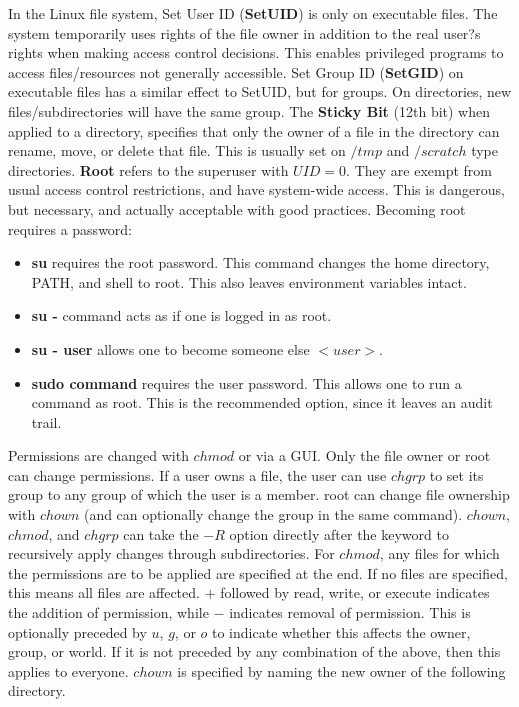 \documentclass[11pt]{article}
\theoremstyle{plain} %
\theoremstyle{definition}
\theoremstyle{example}
\theoremstyle{remark}
\begin{document}
In the Linux file system, Set User ID (\textbf{SetUID}) is only on executable files. The system temporarily uses rights of the file owner in addition to the real user?s rights when making access control decisions. This enables privileged programs to access files/resources not generally accessible. Set Group ID (\textbf{SetGID}) on executable files has a similar effect to SetUID, but for groups. On directories, new files/subdirectories will have the same group. The \textbf{Sticky Bit} (12th bit) when applied to a directory, specifies that only the owner of a file in the directory can rename, move, or delete that file. This is usually set on $/tmp$ and $/scratch$ type directories. \textbf{Root} refers to the superuser with $UID =0$. They are exempt from usual access control restrictions, and have system-wide access. This is dangerous, but necessary, and actually acceptable with good practices. Becoming root requires a password:
\begin{itemize}
	\item \textbf{su} requires the root password. This command changes the home directory, PATH, and shell to root. This also leaves environment variables intact.
	\item \textbf{su -} command acts as if one is logged in as root.
	\item \textbf{su - user} allows one to become someone else $<user>$. 
	\item \textbf{sudo command} requires the user password. This allows one to run a command as root. This is the recommended option, since it leaves an audit trail. 
\end{itemize}

Permissions are changed with $chmod$ or via a GUI. Only the file owner or root can change permissions. If a user owns a file, the user can use $chgrp$ to set its group to any group of which the user is a member. root can change file ownership with $chown$ (and can optionally change the group in the same command). $chown$, $chmod$, and $chgrp$ can take the $-R$ option directly after the keyword to recursively apply changes through subdirectories. For $chmod$, any files for which the permissions are to be applied are specified at the end. If no files are specified, this means all files are affected. $+$ followed by read, write, or execute indicates the addition of permission, while $-$ indicates removal of permission. This is optionally preceded by $u$, $g$, or $o$ to indicate whether this affects the owner, group, or world. If it is not preceded by any combination of the above, then this applies to everyone. $chown$ is specified by naming the new owner of the following directory. 
\end{document}
